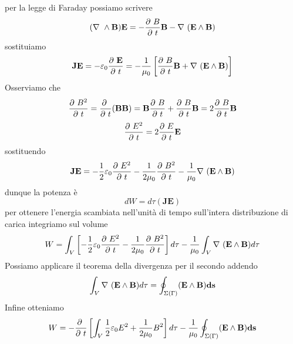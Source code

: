 \documentclass[
10pt, %
a4paper, %
oneside, %
headinclude,footinclude, %
BCOR5mm, %
]{scrartcl}
\begin{document}
per la legge di Faraday possiamo scrivere
\[(\nabla\ \wedge\mathbf{B})\mathbf{E} = -\frac{\partial\  B}{\partial\  t}\mathbf{B}- \nabla\ (\mathbf{E}\wedge\mathbf{B})\]
sostituiamo
\[\mathbf{J}\mathbf{E} = -\varepsilon_0 \frac{\partial\  \mathbf{E}}{\partial\  t} = -\frac{1}{\mu_0}\left[\frac{\partial\  B}{\partial\  t}\mathbf{B}+\nabla\ (\mathbf{E\wedge\mathbf{B}})\right]\]
Osserviamo che 
\[\frac{\partial\  B^2}{\partial\  t} = \frac{\partial\  }{\partial\  t}(\mathbf{B}\mathbf{B}) = \mathbf{B}\frac{\partial\  B}{\partial\  t}+\frac{\partial\  B}{\partial\  t}\mathbf{B}=2\frac{\partial\  B}{\partial\  t}\mathbf{B}\]
\[\frac{\partial\  E^2}{\partial\  t} = 2\frac{\partial\  E}{\partial\  t}\mathbf{E}\]
sostituendo
\[\mathbf{J}\mathbf{E} = -\frac{1}{2}\varepsilon_0\frac{\partial\  E^2}{\partial\  t}-\frac{1}{2\mu_0}\frac{\partial\  B^2}{\partial\  t}-\frac{1}{\mu_0}\nabla\ (\mathbf{E}\wedge\mathbf{B})\]
dunque la potenza è
\[dW = d\tau (\mathbf{J}\mathbf{E})\]
per ottenere l'energia scambiata nell'unità di tempo sull'intera distribuzione di carica integriamo sul volume
\[W = \int_V\left[ -\frac{1}{2}\varepsilon_0\frac{\partial\  E^2}{\partial\  t}-\frac{1}{2\mu_0}\frac{\partial\  B^2}{\partial\  t} \right] d\tau-\frac{1}{\mu_0}\int_V \nabla\ (\mathbf{E}\wedge\mathbf{B})d\tau \]
Possiamo applicare il teorema della divergenza per il secondo addendo 
\[\int_V \nabla\ (\mathbf{E}\wedge\mathbf{B}) d\tau = \oint_{\Sigma(\Gamma)}(\mathbf{E}\wedge\mathbf{B})\mathbf{ds}\]
Infine otteniamo
\[W = -\frac{\partial\  }{\partial\  t}\left[\int_V \frac{1}{2}\varepsilon_0 E^2+\frac{1}{2\mu_0}B^2 \right] d\tau-\frac{1}{\mu_0}\oint_{\Sigma(\Gamma)}(\mathbf{E}\wedge\mathbf{B})\mathbf{ds}\]
\end{document}
